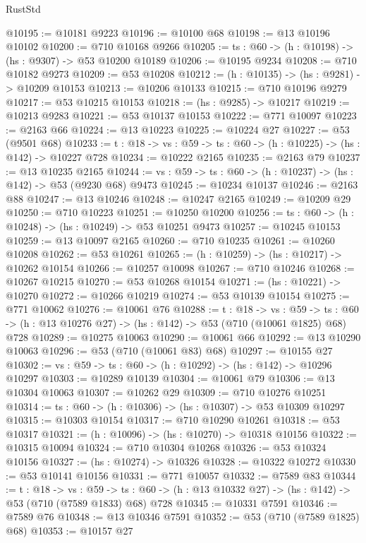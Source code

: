 \begin{lexlean}{RustStd}
\begin{coremodule}
@10195 := @10181 @9223
@10196 := @10100 @68
@10198 := @13 @10196 @10102
@10200 := @710 @10168 @9266
@10205 := {ts : @60} -> (h : @10198) -> (hs : @9307) -> @53 @10200 @10189
@10206 := @10195 @9234
@10208 := @710 @10182 @9273
@10209 := @53 @10208
@10212 := (h : @10135) -> (hs : @9281) -> @10209 @10153
@10213 := @10206 @10133
@10215 := @710 @10196 @9279
@10217 := @53 @10215 @10153
@10218 := (hs : @9285) -> @10217
@10219 := @10213 @9283
@10221 := @53 @10137 @10153
@10222 := @771 @10097
@10223 := @2163 @66
@10224 := @13 @10223
@10225 := @10224 @27
@10227 := @53 (@9501 @68)
@10233 := {t : @18} -> {vs : @59} -> {ts : @60} -> (h : @10225) -> (hs : @142) -> @10227 @728
@10234 := @10222 @2165
@10235 := @2163 @79
@10237 := @13 @10235 @2165
@10244 := {vs : @59} -> {ts : @60} -> (h : @10237) -> (hs : @142) -> @53 (@9230 @68) @9473
@10245 := @10234 @10137
@10246 := @2163 @88
@10247 := @13 @10246
@10248 := @10247 @2165
@10249 := @10209 @29
@10250 := @710 @10223
@10251 := @10250 @10200
@10256 := {ts : @60} -> (h : @10248) -> (hs : @10249) -> @53 @10251 @9473
@10257 := @10245 @10153
@10259 := @13 @10097 @2165
@10260 := @710 @10235
@10261 := @10260 @10208
@10262 := @53 @10261
@10265 := (h : @10259) -> (hs : @10217) -> @10262 @10154
@10266 := @10257 @10098
@10267 := @710 @10246
@10268 := @10267 @10215
@10270 := @53 @10268 @10154
@10271 := (hs : @10221) -> @10270
@10272 := @10266 @10219
@10274 := @53 @10139 @10154
@10275 := @771 @10062
@10276 := @10061 @76
@10288 := {t : @18} ->
  {vs : @59} ->
  {ts : @60} -> (h : @13 @10276 @27) -> (hs : @142) -> @53 (@710 (@10061 @1825) @68) @728
@10289 := @10275 @10063
@10290 := @10061 @66
@10292 := @13 @10290 @10063
@10296 := @53 (@710 (@10061 @83) @68)
@10297 := @10155 @27
@10302 := {vs : @59} -> {ts : @60} -> (h : @10292) -> (hs : @142) -> @10296 @10297
@10303 := @10289 @10139
@10304 := @10061 @79
@10306 := @13 @10304 @10063
@10307 := @10262 @29
@10309 := @710 @10276 @10251
@10314 := {ts : @60} -> (h : @10306) -> (hs : @10307) -> @53 @10309 @10297
@10315 := @10303 @10154
@10317 := @710 @10290 @10261
@10318 := @53 @10317
@10321 := (h : @10096) -> (hs : @10270) -> @10318 @10156
@10322 := @10315 @10094
@10324 := @710 @10304 @10268
@10326 := @53 @10324 @10156
@10327 := (hs : @10274) -> @10326
@10328 := @10322 @10272
@10330 := @53 @10141 @10156
@10331 := @771 @10057
@10332 := @7589 @83
@10344 := {t : @18} ->
  {vs : @59} ->
  {ts : @60} -> (h : @13 @10332 @27) -> (hs : @142) -> @53 (@710 (@7589 @1833) @68) @728
@10345 := @10331 @7591
@10346 := @7589 @76
@10348 := @13 @10346 @7591
@10352 := @53 (@710 (@7589 @1825) @68)
@10353 := @10157 @27

\end{coremodule}
\end{lexlean}
